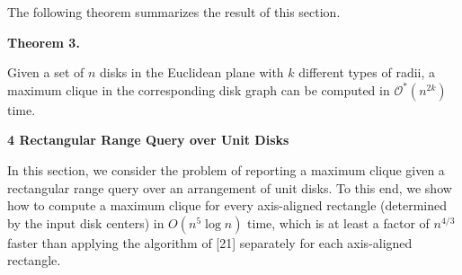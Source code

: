 \par
\par
The following theorem summarizes the result of this section.
\par
\par
\par\medskip\noindent\textbf{Theorem 3.}\par
Given a set of $n$ disks in the Euclidean plane with $k$ different types of radii, a maximum clique in the corresponding disk graph can be computed in $\mathcal{O}^{*}(n^{2k})$ time.
\par
\par
\par
\par
\par\medskip\noindent\textbf{4 Rectangular Range Query over Unit Disks}\par
In this section, we consider the problem of reporting a maximum clique given a rectangular range query over an arrangement of unit disks. To this end, we show how to compute a maximum clique for every axis-aligned rectangle (determined by the input disk centers) in $O(n^{5}\log n)$ time, which is at least a factor of $n^{4/3}$ faster than applying the algorithm of [21] separately for each axis-aligned rectangle.
\par
\par
